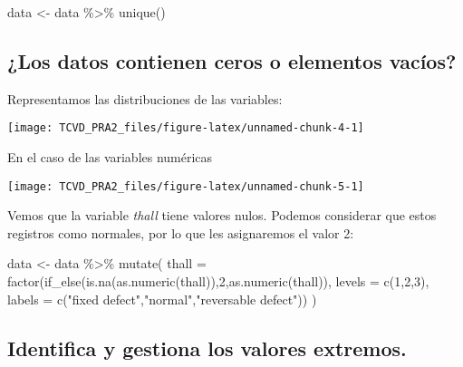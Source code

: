 \documentclass[
]{article}
\newenvironment{Shaded}{\begin{snugshade}}{\end{snugshade}}
\newcommand{\AttributeTok}[1]{\textcolor[rgb]{0.77,0.63,0.00}{#1}}
\newcommand{\DecValTok}[1]{\textcolor[rgb]{0.00,0.00,0.81}{#1}}
\newcommand{\FunctionTok}[1]{\textcolor[rgb]{0.00,0.00,0.00}{#1}}
\newcommand{\NormalTok}[1]{#1}
\newcommand{\OtherTok}[1]{\textcolor[rgb]{0.56,0.35,0.01}{#1}}
\newcommand{\SpecialCharTok}[1]{\textcolor[rgb]{0.00,0.00,0.00}{#1}}
\newcommand{\StringTok}[1]{\textcolor[rgb]{0.31,0.60,0.02}{#1}}
\begin{document}
\begin{Shaded}
\begin{Highlighting}[]
\NormalTok{data }\OtherTok{\textless{}{-}}\NormalTok{ data }\SpecialCharTok{\%\textgreater{}\%} 
  \FunctionTok{unique}\NormalTok{()}
\end{Highlighting}
\end{Shaded}

\hypertarget{los-datos-contienen-ceros-o-elementos-vacuxedos}{%
\subsection{¿Los datos contienen ceros o elementos
vacíos?}\label{los-datos-contienen-ceros-o-elementos-vacuxedos}}

Representamos las distribuciones de las variables:

\begin{center}\texttt{[image: TCVD\_PRA2\_files/figure-latex/unnamed-chunk-4-1]} \end{center}

En el caso de las variables numéricas

\begin{center}\texttt{[image: TCVD\_PRA2\_files/figure-latex/unnamed-chunk-5-1]} \end{center}

Vemos que la variable \emph{thall} tiene valores nulos. Podemos
considerar que estos registros como normales, por lo que les asignaremos
el valor 2:

\begin{Shaded}
\begin{Highlighting}[]
\NormalTok{data }\OtherTok{\textless{}{-}}\NormalTok{ data }\SpecialCharTok{\%\textgreater{}\%} 
  \FunctionTok{mutate}\NormalTok{(}
    \AttributeTok{thall =} \FunctionTok{factor}\NormalTok{(}\FunctionTok{if\_else}\NormalTok{(}\FunctionTok{is.na}\NormalTok{(}\FunctionTok{as.numeric}\NormalTok{(thall)),}\DecValTok{2}\NormalTok{,}\FunctionTok{as.numeric}\NormalTok{(thall)), }
                   \AttributeTok{levels =} \FunctionTok{c}\NormalTok{(}\DecValTok{1}\NormalTok{,}\DecValTok{2}\NormalTok{,}\DecValTok{3}\NormalTok{),}
                   \AttributeTok{labels =} \FunctionTok{c}\NormalTok{(}\StringTok{"fixed defect"}\NormalTok{,}\StringTok{"normal"}\NormalTok{,}\StringTok{"reversable defect"}\NormalTok{))}
\NormalTok{  )}
\end{Highlighting}
\end{Shaded}

\hypertarget{identifica-y-gestiona-los-valores-extremos.}{%
\subsection{Identifica y gestiona los valores
extremos.}\label{identifica-y-gestiona-los-valores-extremos.}}
\end{document}

